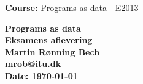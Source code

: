 \documentclass[a4paper,11pt]{article}
\begin{document}
\begin{titlepage}
\begin{flushleft}
\textbf{Course:} Programs as data - E2013
\end{flushleft}
\vspace{30mm}
\centering \parindent=0pt
\Huge\bfseries
Programs as data\\[0.7cm]
\large Eksamens aflevering\\
\vspace{20mm}
    Martin Rønning Bech 
\\  mrob@itu.dk\\
\vspace{50mm}
Date: \today
\end{titlepage}


\end{document}
